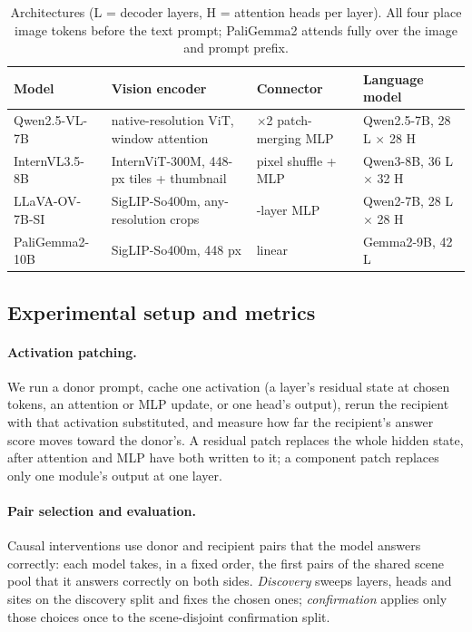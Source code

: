 \documentclass[11pt]{article}
\begin{document}
\begin{table}[h]
\centering
\scriptsize
\setlength{\tabcolsep}{2pt}
\begin{tabularx}{\columnwidth}{@{}l>{\raggedright\arraybackslash}X>{\raggedright\arraybackslash}X>{\raggedright\arraybackslash}p{}@{}}
\toprule
Model & Vision encoder & Connector & Language model \\
\midrule
Qwen2.5-VL-7B & native-resolution ViT, window attention & 2$\times$2 patch-merging MLP & Qwen2.5-7B, 28 L $\times$ 28 H \\
InternVL3.5-8B & InternViT-300M, 448-px tiles + thumbnail & pixel shuffle + MLP & Qwen3-8B, 36 L $\times$ 32 H \\
LLaVA-OV-7B-SI & SigLIP-So400m, any-resolution crops & 2-layer MLP & Qwen2-7B, 28 L $\times$ 28 H \\
PaliGemma2-10B & SigLIP-So400m, 448 px & linear & Gemma2-9B, 42 L \\
\bottomrule
\end{tabularx}
\caption{Architectures (L = decoder layers, H = attention heads per layer). All four place image tokens before the text prompt; PaliGemma2 attends fully over the image and prompt prefix.}
\label{tab:arch}
\end{table}

\subsection{Experimental setup and metrics}

\paragraph{Activation patching.} We run a donor prompt, cache one activation (a layer's residual state at chosen tokens, an attention or MLP update, or one head's output), rerun the recipient with that activation substituted, and measure how far the recipient's answer score moves toward the donor's. A residual patch replaces the whole hidden state, after attention and MLP have both written to it; a component patch replaces only one module's output at one layer.

\paragraph{Pair selection and evaluation.} Causal interventions use donor and recipient pairs that the model answers correctly: each model takes, in a fixed order, the first pairs of the shared scene pool that it answers correctly on both sides. \emph{Discovery} sweeps layers, heads and sites on the discovery split and fixes the chosen ones; \emph{confirmation} applies only those choices once to the scene-disjoint confirmation split.
\end{document}
